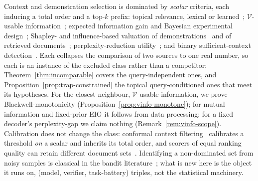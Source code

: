 \documentclass[11pt]{article}
\theoremstyle{plain}
\theoremstyle{definition}
\theoremstyle{remark}
\newcommand{\Vcal}{\mathcal{V}}
\begin{document}
Context and demonstration selection is dominated by \emph{scalar} criteria, each inducing a total
order and a top-$k$ prefix: topical relevance, lexical or learned~\citep{rankrag2024};
$\Vcal$-usable information~\citep{ethayarajh2022,cale2025}; expected information gain and Bayesian
experimental design~\citep{bedllm2026,conformalip2025}; Shapley- and influence-based valuation of
demonstrations~\citep{demoshapley2024,inficl2024} and of retrieved
documents~\citep{nematov2025shapley}; perplexity-reduction utility~\citep{dai2025seper}; and
binary sufficient-context detection~\citep{sufficientcontext2024}. Each collapses the comparison
of two sources to one real number, so each is an instance of the excluded class rather than a
competitor: Theorem~\ref{thm:incomparable} covers the query-independent ones, and
Proposition~\ref{prop:trap-constrained} the topical query-conditioned ones that meet its
hypotheses. For the closest neighbour, $\Vcal$-usable information, we prove Blackwell-monotonicity
(Proposition~\ref{prop:vinfo-monotone}); for mutual information and fixed-prior EIG it follows from
data processing; for a fixed decoder's perplexity-gap we claim nothing
(Remark~\ref{rem:vinfo-scope}). Calibration does not change the class: conformal context
filtering~\citep{chakraborty2026conformal} calibrates a threshold \emph{on} a scalar and inherits
its total order, and scorers of equal ranking quality can retain different document
sets~\citep{frohmann2026orderconsistent}. Identifying a non-dominated set from noisy samples is
classical in the bandit literature~\citep{auer2016pareto}; what is new here is the object it runs
on, (model, verifier, task-battery) triples, not the statistical machinery.
\end{document}

